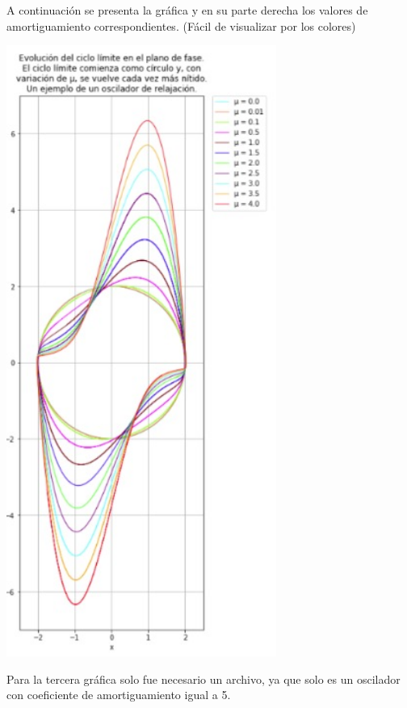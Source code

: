 \documentclass[12pt]{article}
\begin{document}
A continuación se presenta la gráfica y en su parte derecha los valores de amortiguamiento correspondientes. (Fácil de visualizar por los colores)
\begin{center}
    \includegraphics[height=20cm]{3.jpeg}\\
\end{center}
Para la tercera gráfica solo fue necesario un archivo, ya que solo es un oscilador con coeficiente de amortiguamiento igual a 5.
\end{document}
